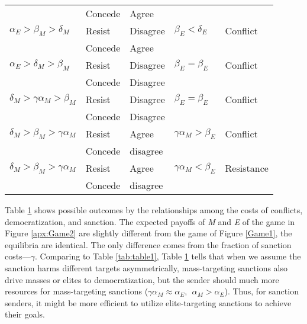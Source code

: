 \documentclass[11pt]{article}
\begin{document}
\begin{table}[!ht]
\begin{tabular}{ p{3cm} p{2cm} p{2cm} p{3cm} p{3cm} }
                                          & Concede  & Agree    &                           &                \\
    $\alpha_{E} > \beta_{M} > \delta_{M}$	& Resist   & Disagree & $\beta_{E} < \delta_{E}$  & Conflict     \\
                                          & Concede  & Agree    &                           &                \\
		$\alpha_{E} > \delta_{M} > \beta_{M}$	& Resist   & Disagree  & $\beta_{E} = \beta_{E}$   & Conflict \\
	     	                                  & Concede  & Disagree &                           &                \\
		$\delta_{M} > \gamma\alpha_{M} > \beta_{M}$ & Resist   & Disagree & $\beta_{E} = \beta_{E}$   & Conflict \\
	                                        & Concede  & Disagree &                           &                \\
		$\delta_{M} > \beta_{M} > \gamma\alpha_{M}$	& Resist   & Agree    & $\gamma\alpha_{M} > \beta_{E}$  & Conflict  \\
		                                      & Concede  & disagree &                           &                \\
    $\delta_{M} > \beta_{M} > \gamma\alpha_{M}$	& Resist   & Agree    & $\gamma\alpha_{M} < \beta_{E}$  & Resistance\\
		                                            & Concede  & disagree &                                &      \\
		\bottomrule
	\end{tabular}
	{\raggedright }
	\label{apx:table1}
\end{table}

Table \ref{apx:table1} shows possible outcomes by the relationships among the costs of conflicts, democratization, and sanction. The expected payoffs of \textit{M} and \textit{E} of the game in Figure \ref{apx:Game2} are slightly different from the game of Figure \ref{Game1}, the equilibria are identical. The only difference comes from the fraction of sanction costs---$\gamma$. Comparing to Table \ref{tab:table1}, Table \ref{apx:table1} tells that when we assume the sanction harms different targets asymmetrically, mass-targeting sanctions also drive masses or elites to democratization, but the sender should much more resources for mass-targeting sanctions ($\gamma\alpha_{M} \approx \alpha_{E}, \:\:\alpha_{M} > \alpha_{E}$). Thus, for sanction senders, it might be more efficient to utilize elite-targeting sanctions to achieve their goals.
\end{document}
